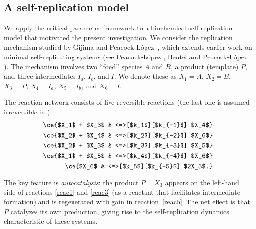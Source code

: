 \documentclass{article}
\begin{document}
\subsection{A self-replication model}  \label{sec:replication}
We apply the critical parameter framework to a biochemical self-replication 
model that motivated the present investigation.
We consider the replication mechanism studied by Gijima and Peacock-L\'opez~\cite{GPL2020}, 
which extends earlier work on minimal self-replicating 
systems (see Peacock-L\'opez \cite{PeacockLopez2001}, Beutel and Peacock-L\'opez \cite{BeutelPL2006}). The mechanism involves two ``food'' 
species $A$ and $B$, a product (template) $P$, and three intermediates $I_a$, $I_b$, 
and $I$. We denote these as $X_1 = A$, $X_2 = B$, $X_3 = P$, 
$X_4 = I_a$, $X_5 = I_b$, and $X_6 = I$.

The reaction network consists of five reversible reactions (the last one is assumed irreversible in \cite{GPL2020}):
\begin{align}
\ce{$X_1$ + $X_3$ & <=>[$k_1$][$k_{-1}$] $X_4$} \label{reac1}\\
\ce{$X_2$ + $X_4$ & <=>[$k_2$][$k_{-2}$] $X_6$} \label{reac2}\\
\ce{$X_2$ + $X_3$ & <=>[$k_3$][$k_{-3}$] $X_5$} \label{reac3}\\
\ce{$X_1$ + $X_5$ & <=>[$k_4$][$k_{-4}$] $X_6$} \label{reac4}\\
\ce{$X_6$ & <=>[$k_5$][$k_{-5}$] $2X_3$.} \label{reac5}
\end{align}


The key feature is \emph{autocatalysis}: the product $P = X_3$ appears on the 
left-hand side of reactions \eqref{reac1} and \eqref{reac3} (as a reactant that 
facilitates intermediate formation) and is regenerated with gain in reaction~\eqref{reac5}. 
The net effect is that $P$ catalyzes its own production, giving rise to the 
self-replication dynamics characteristic of these systems.
\end{document}
